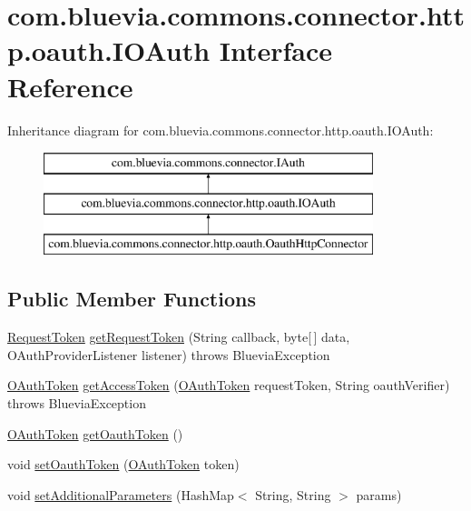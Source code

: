 \hypertarget{interfacecom_1_1bluevia_1_1commons_1_1connector_1_1http_1_1oauth_1_1IOAuth}{
\section{com.bluevia.commons.connector.http.oauth.IOAuth Interface Reference}
\label{interfacecom_1_1bluevia_1_1commons_1_1connector_1_1http_1_1oauth_1_1IOAuth}
}
Inheritance diagram for com.bluevia.commons.connector.http.oauth.IOAuth:\begin{figure}[H]
\begin{center}
\leavevmode
\includegraphics[height=3.000000cm]{interfacecom_1_1bluevia_1_1commons_1_1connector_1_1http_1_1oauth_1_1IOAuth}
\end{center}
\end{figure}
\subsection*{Public Member Functions}
\begin{DoxyCompactItemize}
\item 
\hyperlink{classcom_1_1bluevia_1_1commons_1_1connector_1_1http_1_1oauth_1_1RequestToken}{RequestToken} \hyperlink{interfacecom_1_1bluevia_1_1commons_1_1connector_1_1http_1_1oauth_1_1IOAuth_a5fcc08723e76b277b54777f94031b507}{getRequestToken} (String callback, byte\mbox{[}$\,$\mbox{]} data, OAuthProviderListener listener)  throws BlueviaException
\item 
\hyperlink{classcom_1_1bluevia_1_1commons_1_1connector_1_1http_1_1oauth_1_1OAuthToken}{OAuthToken} \hyperlink{interfacecom_1_1bluevia_1_1commons_1_1connector_1_1http_1_1oauth_1_1IOAuth_a781f46d7787b9b2ccd5aba9d19b5bb54}{getAccessToken} (\hyperlink{classcom_1_1bluevia_1_1commons_1_1connector_1_1http_1_1oauth_1_1OAuthToken}{OAuthToken} requestToken, String oauthVerifier)  throws BlueviaException
\item 
\hyperlink{classcom_1_1bluevia_1_1commons_1_1connector_1_1http_1_1oauth_1_1OAuthToken}{OAuthToken} \hyperlink{interfacecom_1_1bluevia_1_1commons_1_1connector_1_1http_1_1oauth_1_1IOAuth_a30759302a10a85ddec505fa376bea649}{getOauthToken} ()
\item 
void \hyperlink{interfacecom_1_1bluevia_1_1commons_1_1connector_1_1http_1_1oauth_1_1IOAuth_a27725eabc503c62859b46a7cc9093a24}{setOauthToken} (\hyperlink{classcom_1_1bluevia_1_1commons_1_1connector_1_1http_1_1oauth_1_1OAuthToken}{OAuthToken} token)
\item 
void \hyperlink{interfacecom_1_1bluevia_1_1commons_1_1connector_1_1http_1_1oauth_1_1IOAuth_ad58d6b47d9b204d0dd2efee3d74d6cb1}{setAdditionalParameters} (HashMap$<$ String, String $>$ params)
\end{DoxyCompactItemize}


